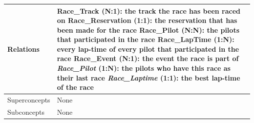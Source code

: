 \documentclass{beamer}
\begin{document}
\begin{frame}
\begin{table}
\tiny
\begin{tabular}{|p{2cm}|p{6cm}|}
\hline
Relations & 
Race\_Track (N:1): the track the race has been raced on \newline
Race\_Reservation (1:1): the reservation that has been made for the race \newline
Race\_Pilot (N:N): the pilots that participated in the race \newline
Race\_LapTime (1:N): every lap-time of every pilot that participated in the race \newline
Race\_Event (N:1): the event the race is part of \newline
\textit{Race\_Pilot} (1:N): the pilots who have this race as their last race \newline
\textit{Race\_Laptime} (1:1): the best lap-time of the race \\
\hline
Superconcepts & None \\
\hline
Subconcepts & None \\
\hline
\end{tabular}
\end{table}
\end{frame}
\end{document}
